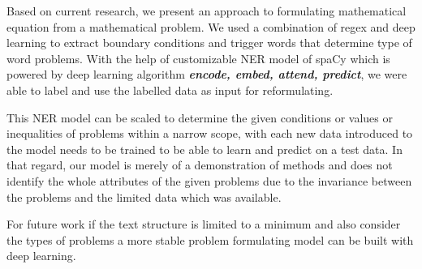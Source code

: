 Based on current research, we present an approach to formulating mathematical equation from a mathematical problem. We used a combination of regex and deep learning to extract boundary conditions and trigger words that determine type of word problems. With the help of customizable NER model of spaCy which is powered by deep learning algorithm \textbf{\textit{encode, embed, attend, predict}}, we were able to label and use the labelled data as input for reformulating.
\par This NER model can be scaled to determine the given conditions or values or inequalities of problems within a narrow scope, with each new data introduced to the model needs to be trained to be able to learn and predict on a test data. In that regard, our model is merely of a demonstration of methods and does not identify the whole attributes of the given problems due to the invariance between the problems and the limited data which was available.
\par For future work if the text structure is limited to a minimum and also consider the types of problems a more stable problem formulating model can be built with deep learning. 